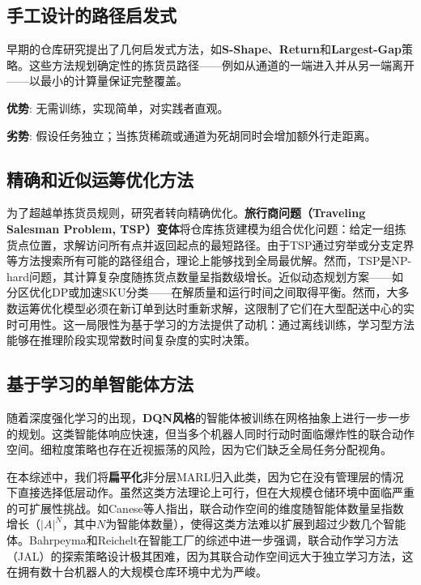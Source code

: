 \documentclass[12pt,a4paper]{article}
\begin{document}
\subsection{手工设计的路径启发式}

早期的仓库研究提出了几何启发式方法，如\textbf{S-Shape}、\textbf{Return}和\textbf{Largest-Gap}策略\citep{ratliff1983sshape}。这些方法规划确定性的拣货员路径——例如从通道的一端进入并从另一端离开——以最小的计算量保证完整覆盖。

\textbf{优势}: 无需训练，实现简单，对实践者直观。

\textbf{劣势}: 假设任务独立；当拣货稀疏或通道为死胡同时会增加额外行走距离。

\subsection{精确和近似运筹优化方法}

为了超越单拣货员规则，研究者转向精确优化。\textbf{旅行商问题（Traveling Salesman Problem, TSP）变体}将仓库拣货建模为组合优化问题：给定一组拣货点位置，求解访问所有点并返回起点的最短路径。由于TSP通过穷举或分支定界等方法搜索所有可能的路径组合，理论上能够找到全局最优解。然而，TSP是NP-hard问题，其计算复杂度随拣货点数量呈指数级增长\citep{de_koster1998routing}。近似动态规划方案——如分区优化DP或加速SKU分类——在解质量和运行时间之间取得平衡。然而，大多数运筹优化模型必须在新订单到达时重新求解，这限制了它们在大型配送中心的实时可用性。这一局限性为基于学习的方法提供了动机：通过离线训练，学习型方法能够在推理阶段实现常数时间复杂度的实时决策。

\subsection{基于学习的单智能体方法}

随着深度强化学习的出现，\textbf{DQN风格}的智能体被训练在网格抽象上进行一步一步的规划\citep{alam2024rl}。这类智能体响应快速，但当多个机器人同时行动时面临爆炸性的联合动作空间。细粒度策略也存在近视振荡的风险，因为它们缺乏全局任务分配视角。

在本综述中，我们将\textbf{扁平化}非分层MARL归入此类，因为它在没有管理层的情况下直接选择低层动作。虽然这类方法理论上可行，但在大规模仓储环境中面临严重的可扩展性挑战。如Canese等人\citep{canese2021marl}指出，联合动作空间的维度随智能体数量呈指数增长（$|A|^N$，其中$N$为智能体数量），使得这类方法难以扩展到超过少数几个智能体。Bahrpeyma和Reichelt\citep{bahrpeyma2022review}在智能工厂的综述中进一步强调，联合动作学习方法（JAL）的探索策略设计极其困难，因为其联合动作空间远大于独立学习方法，这在拥有数十台机器人的大规模仓库环境中尤为严峻。
\end{document}
